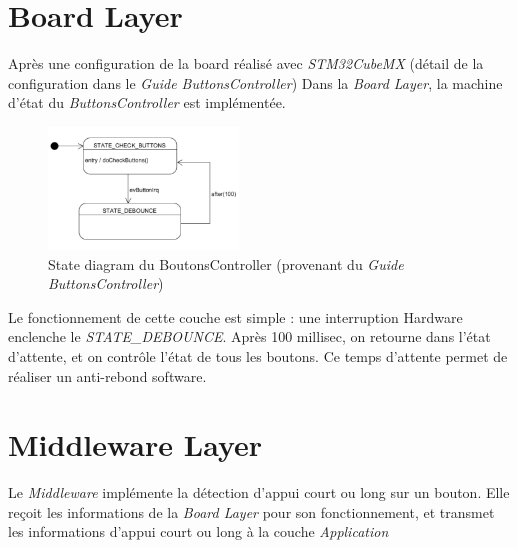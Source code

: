 \section{Board Layer}
Après une configuration de la board réalisé avec \emph{STM32CubeMX} (détail
de la configuration dans le \emph{Guide ButtonsController}\footnotemark[1])
Dans la \emph{Board Layer}, la machine d'état du \emph{ButtonsController}
est implémentée.
\begin{figure}[H]
    \centering
    \includegraphics[width=0.45\textwidth]{Images/buttons/btnCtrl.PNG}
    \caption[Full UML]{State diagram du BoutonsController (provenant du \emph{Guide ButtonsController}\footnotemark[1])}
\end{figure}
Le fonctionnement de cette couche est simple : une interruption Hardware enclenche
le \emph{STATE\_DEBOUNCE}. Après 100 millisec, on retourne dans l'état d'attente,
et on contrôle l'état de tous les boutons. Ce temps d'attente permet de réaliser un
anti-rebond software.\newpage

\section{Middleware Layer}
Le \emph{Middleware} implémente la détection d'appui court ou long sur un bouton.
Elle reçoit les informations de la \emph{Board Layer} pour son fonctionnement, et
transmet les informations d'appui court ou long à la couche \emph{Application}
